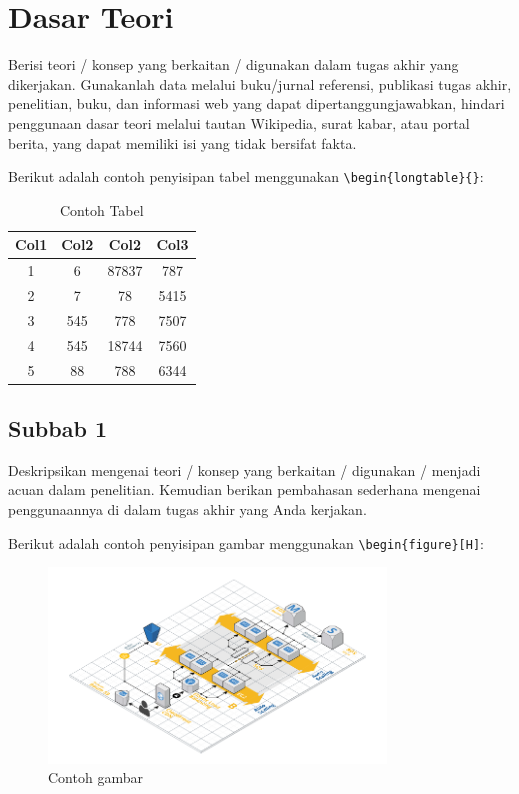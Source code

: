 \section{Dasar Teori} \label{II.Teori}
Berisi teori / konsep yang berkaitan / digunakan dalam tugas akhir yang dikerjakan. Gunakanlah data melalui buku/jurnal referensi, publikasi tugas akhir, penelitian, buku, dan informasi web yang dapat dipertanggungjawabkan, hindari penggunaan dasar teori melalui tautan Wikipedia, surat kabar, atau portal berita, yang dapat memiliki isi yang tidak bersifat fakta. \par

Berikut adalah contoh penyisipan tabel menggunakan \verb|\begin{longtable}{}|: \par

\begin{longtable}{|c|c|c|c|}
	\caption{Contoh Tabel}
	\label{table:2.contoh}\\
	\hline
	Col1 & Col2 & Col2 & Col3 \\
	\hline
	\endhead
	1 & 6 & 87837 & 787 \\ 
	\hline
	2 & 7 & 78 & 5415 \\
	\hline
	3 & 545 & 778 & 7507 \\
	\hline
	4 & 545 & 18744 & 7560 \\
	\hline
	5 & 88 & 788 & 6344 \\
	\hline
\end{longtable}

\subsection{Subbab 1} \label{II.Subbab1}
Deskripsikan mengenai teori / konsep yang berkaitan / digunakan / menjadi acuan dalam penelitian. Kemudian berikan pembahasan sederhana mengenai penggunaannya di dalam tugas akhir yang Anda kerjakan. \par

Berikut adalah contoh penyisipan gambar menggunakan \verb|\begin{figure}[H]|:

\begin{figure}[H] %
    \centering
    \includegraphics[width=0.8\textwidth]{figure/chapter-2-infrastructure-diagram.png}
    \caption{Contoh gambar}
    \label{fig:2.contoh}
\end{figure}

